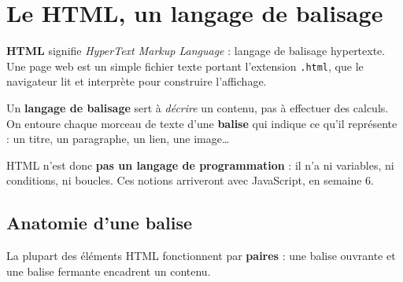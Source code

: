 \documentclass[a4paper,11pt]{article}
\begin{document}
\section{Le HTML, un langage de balisage}

\textbf{HTML} signifie \textit{HyperText Markup Language} : langage de balisage hypertexte. Une page web est un simple fichier texte portant l'extension \texttt{.html}, que le navigateur lit et interprète pour construire l'affichage.

\begin{tcolorbox}[definition, title={Définition --- Langage de balisage}]
Un \textbf{langage de balisage} sert à \textit{décrire} un contenu, pas à effectuer des calculs. On entoure chaque morceau de texte d'une \textbf{balise} qui indique ce qu'il représente : un titre, un paragraphe, un lien, une image\dots

\vspace{3pt}
HTML n'est donc \textbf{pas un langage de programmation} : il n'a ni variables, ni conditions, ni boucles. Ces notions arriveront avec JavaScript, en semaine 6.
\end{tcolorbox}

\subsection{Anatomie d'une balise}

La plupart des éléments HTML fonctionnent par \textbf{paires} : une balise ouvrante et une balise fermante encadrent un contenu.

\vspace{6pt}
\begin{center}
\end{center}
\vspace{2pt}
\end{document}
